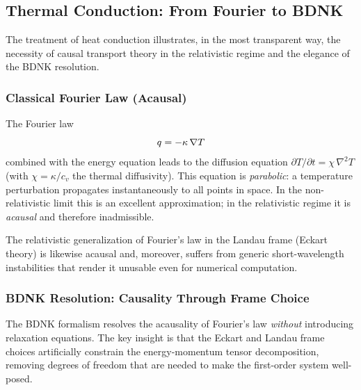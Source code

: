 \subsection{Thermal Conduction: From Fourier to BDNK}
\label{subsec:heat-conduction}

The treatment of heat conduction illustrates, in the most transparent
way, the necessity of causal transport theory in the relativistic
regime and the elegance of the BDNK resolution.

\subsubsection{Classical Fourier Law (Acausal)}
The Fourier law
\begin{equation}
  q = -\kappa\,\nabla T
  \label{eq:fourier}
\end{equation}
combined with the energy equation leads to the diffusion equation
$\partial T/\partial t = \chi\,\nabla^{2}T$ (with
$\chi = \kappa/c_{v}$ the thermal diffusivity).  This equation is
\emph{parabolic}: a temperature perturbation propagates
instantaneously to all points in space.  In the non-relativistic
limit this is an excellent approximation; in the relativistic regime
it is \emph{acausal} and therefore inadmissible.

The relativistic generalization of Fourier's law in the Landau frame
(Eckart theory) is likewise acausal and, moreover, suffers from
generic short-wavelength instabilities that render it unusable even
for numerical computation.

\subsubsection{BDNK Resolution: Causality Through Frame Choice}
\label{subsubsec:BDNK-heat}

The BDNK formalism resolves the acausality of Fourier's law
\emph{without} introducing relaxation equations.  The key insight is
that the Eckart and Landau frame choices artificially constrain
the energy-momentum tensor decomposition, removing degrees of
freedom that are needed to make the first-order system
well-posed.

